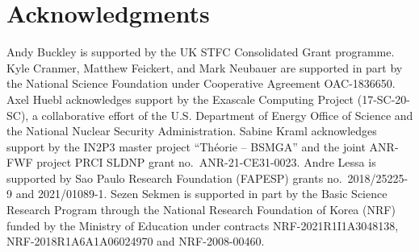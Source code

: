 \documentclass[11pt]{article}
\begin{document}
\section*{Acknowledgments}

Andy Buckley is supported by the UK STFC Consolidated Grant programme.
Kyle Cranmer, Matthew Feickert, and Mark Neubauer are supported in part by the National Science Foundation under Cooperative Agreement OAC-1836650.
Axel Huebl acknowledges support by the Exascale Computing Project (17-SC-20-SC), a collaborative effort of the U.S. Department of Energy Office of Science and the National Nuclear Security Administration.
Sabine Kraml acknowledges support by the IN2P3 master project ``Th\'eorie -- BSMGA'' and the joint ANR-FWF project PRCI SLDNP grant no.~ANR-21-CE31-0023.
Andre Lessa is supported by Sao Paulo Research Foundation (FAPESP) grants no.~2018/25225-9 and 2021/01089-1.
Sezen Sekmen is supported in part by the Basic Science Research Program through the National Research Foundation of Korea (NRF) funded by the Ministry of Education under contracts NRF-2021R1I1A3048138, NRF-2018R1A6A1A06024970 and NRF-2008-00460.


\def\thefootnote{\fnsymbol{footnote}}
\setcounter{footnote}{0}




%
\clearpage
\printglossaries
\end{document}
